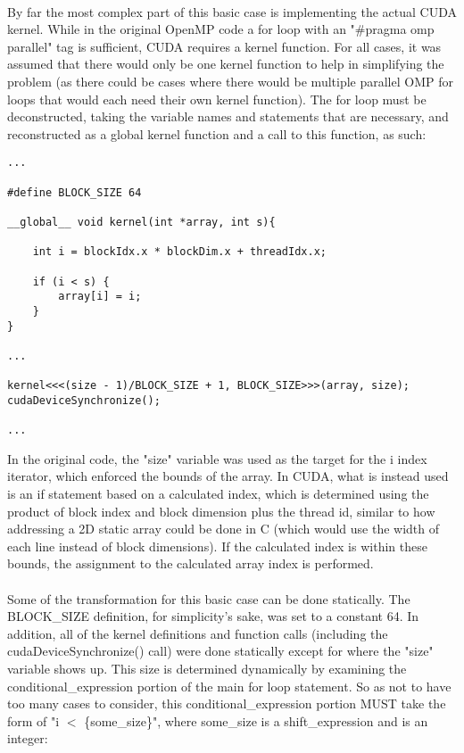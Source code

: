 \documentclass{article}
\begin{document}
\paragraph{}
By far the most complex part of this basic case is implementing the actual CUDA kernel. While in the original OpenMP code a for loop with an "\#pragma omp parallel" tag is sufficient, CUDA requires a kernel function. For all cases, it was assumed that there would only be one kernel function to help in simplifying the problem (as there could be cases where there would be multiple parallel OMP for loops that would each need their own kernel function). The for loop must be deconstructed, taking the variable names and statements that are necessary, and reconstructed as a global kernel function and a call to this function, as such:

\begin{lstlisting}
...

#define BLOCK_SIZE 64

__global__ void kernel(int *array, int s){
	
	int i = blockIdx.x * blockDim.x + threadIdx.x;

	if (i < s) {
		array[i] = i;
	}
}

...

kernel<<<(size - 1)/BLOCK_SIZE + 1, BLOCK_SIZE>>>(array, size);	
cudaDeviceSynchronize();

...

\end{lstlisting}

In the original code, the "size" variable was used as the target for the i index iterator, which enforced the bounds of the array. In CUDA, what is instead used is an if statement based on a calculated index, which is determined using the product of block index and block dimension plus the thread id, similar to how addressing a 2D static array could be done in C (which would use the width of each line instead of block dimensions). If the calculated index is within these bounds, the assignment to the calculated array index is performed.

\paragraph{}
Some of the transformation for this basic case can be done statically. The BLOCK\_SIZE definition, for simplicity's sake, was set to a constant 64. In addition, all of the kernel definitions and function calls (including the cudaDeviceSynchronize() call) were done statically except for where the "size" variable shows up. This size is determined dynamically by examining the conditional\_expression portion of the main for loop statement. So as not to have too many cases to consider, this conditional\_expression portion MUST take the form of "i $<$ \{some\_size\}", where some\_size is a shift\_expression and is an integer:
\end{document}
